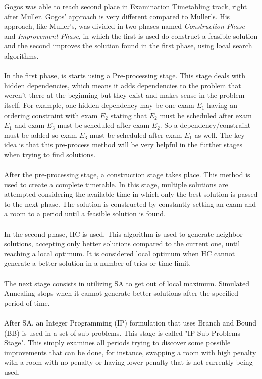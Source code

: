 Gogos was able to reach second place in Examination Timetabling track, right after Muller. Gogos' approach is very different compared to Muller's. His approach, like Muller's, was divided in two phases named \textit{Construction Phase} and \textit{Improvement Phase}, in which the first is used do construct a feasible solution and the second improves the solution found in the first phase, using local search algorithms.\\
\\
In the first phase, is starts using a Pre-processing stage. This stage deals with hidden dependencies, which means it adds dependencies to the problem that weren't there at the beginning but they exist and makes sense in the problem itself. For example, one hidden dependency may be one exam $E_1$ having an ordering constraint with exam $E_2$ stating that $E_2$ must be scheduled after exam $E_1$ and exam $E_3$ must be scheduled after exam $E_2$. So a dependency/constraint must be added so exam $E_3$ must be scheduled after exam $E_1$ as well. The key idea is that this pre-process method will be very helpful in the further stages when trying to find solutions.\\
\\
After the pre-processing stage, a construction stage takes place. This method is used to create a complete timetable. In this stage, multiple solutions are attempted considering the available time in which only the best solution is passed to the next phase. The solution is constructed by constantly setting an exam and a room to a period until a feasible solution is found.\\
\\
In the second phase, HC is used. This algorithm is used to generate neighbor solutions, accepting only better solutions compared to the current one, until reaching a local optimum. It is considered local optimum when HC cannot generate a better solution in a number of tries or time limit.\\
\\
The next stage consists in utilizing SA to get out of local maximum. Simulated Annealing stops when it cannot generate better solutions after the specified period of time.\\
\\
After SA, an Integer Programming (IP) formulation that uses Branch and Bound (BB) is used in a set of sub-problems. This stage is called "IP Sub-Problems Stage". This simply examines all periods trying to discover some possible improvements that can be done, for instance, swapping a room with high penalty with a room with no penalty or having lower penalty that is not currently being used.\\
